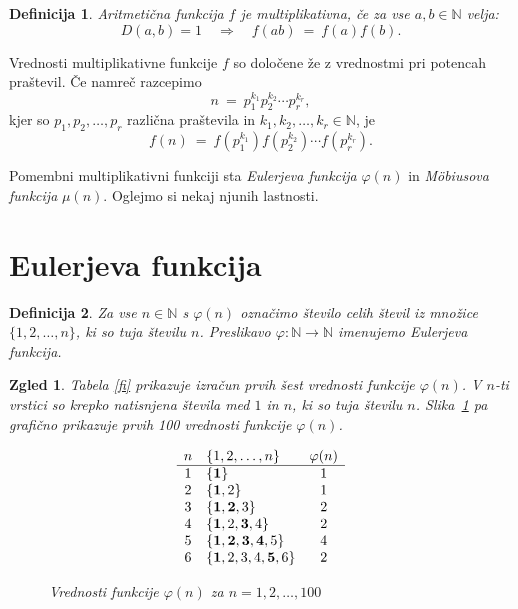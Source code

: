 \documentclass[a4paper,12pt]{article}
\def\N{\mathbb{N}} %
\newtheorem{definicija}{Definicija}
\newtheorem{zgled}{Zgled}
\begin{document}
\begin{definicija}
Aritmetična funkcija $f$ je {\em multiplikativna}, če za vse $a, b \in \N$ velja:
\[
D(a, b) = 1 \quad \Longrightarrow\quad f(ab)\ =\ f(a)f(b).
\]
\end{definicija}

Vrednosti multiplikativne funkcije $f$  so določene že z vrednostmi pri
potencah praštevil. Če namreč razcepimo 
\[
n\ =\ p_1^{k_1} p_2^{k_2} \cdots p_r^{k_r},
\]
kjer so $p_1, p_2, \ldots, p_r$ različna praštevila in $k_1, k_2, \ldots, k_r \in \N$, je
\[
f(n)\ =\ f\!\left(p_1^{k_1}\right) f\!\left(p_2^{k_2}\right) \cdots f\!\left(p_r^{k_r}\right).
\]

Pomembni multiplikativni funkciji sta {\em Eulerjeva funkcija\/} $\varphi(n)$ in {\em M\"obiusova funkcija\/} $\mu(n)$. Oglejmo si nekaj njunih lastnosti.



\section{Eulerjeva funkcija}


\begin{definicija}
Za vse $n \in \N$ s $\varphi(n)$ označimo število 
celih števil iz množice $\{1, 2, \ldots, n\}$, ki so tuja številu $n$.
Preslikavo $\varphi: \N \to \N$ imenujemo \em{Eulerjeva funkcija}.
\end{definicija}

\begin{zgled}
Tabela \ref{fi} prikazuje izračun prvih šest vrednosti funkcije $\varphi(n)$. V $n$-ti vrstici so 
krepko natisnjena števila med $1$ in $n$, ki so tuja številu $n$. Slika~\ref{fi100} pa grafično prikazuje prvih 100 vrednosti funkcije $\varphi(n)$.
\begin{table}[h]
\[
\begin{array}{clc}
 n & \{1,2,\ldots, n\}          & \varphi(n)       \\
 \hline
 1 & \{{\bf 1}\}                    &     1      \\
 2 & \{{\bf 1},2 \}                &     1      \\
 3 & \{{\bf 1,2},3 \}             &     2      \\
 4 & \{{\bf 1},2,{\bf 3},4 \} &     2      \\
 5 & \{{\bf 1,2,3,4},5 \}       &     4      \\
 6 & \{{\bf 1},2,3,4,{\bf 5},6 \} &     2
\end{array}
\] 
\caption{Vrednosti funkcije $\varphi(n)$ za $n = 1,2,\ldots,6$}\label{fi}
\end{table}

\begin{figure}[h]
\caption{Vrednosti funkcije $\varphi(n)$ za $n = 1,2,\ldots,100$}\label{fi100}
\end{figure}
\end{zgled}
\end{document}
